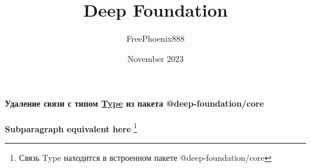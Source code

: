\documentclass{article}
\title{Deep Foundation}
\author{FreePhoenix888}
\date{November 2023}
\newcommand\sublevel[1]{%
  \par\medskip\noindent\textbf{#1}\quad\ignorespaces}
\begin{document}
\maketitle
\newpage

\tableofcontents

\paragraph{Удаление связи с типом \hyperref[typeNote]{Type} из пакета @deep-foundation/core}
\leavevmode
\sublevel{Subparagraph equivalent here}
\label{typeNote}\footnote{Связь Type находится в встроенном пакете @deep-foundation/core}
\end{document}
